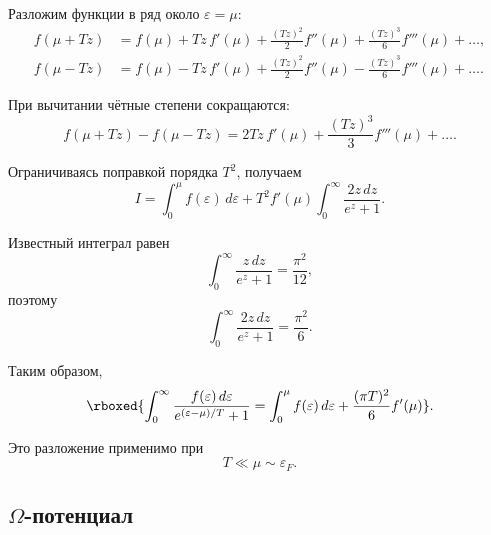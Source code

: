 \documentclass[../final.tex]{subfiles}
\begin{document}
Разложим функции в ряд около $\varepsilon=\mu$:
%
\begin{align*}
    f(\mu+Tz)
    &=
    f(\mu)
    +
    Tz\,f'(\mu)
    +
    \frac{(Tz)^2}{2}f''(\mu)
    +
    \frac{(Tz)^3}{6}f'''(\mu)
    +
    \ldots,
    \\[6pt]
    f(\mu-Tz)
    &=
    f(\mu)
    -
    Tz\,f'(\mu)
    +
    \frac{(Tz)^2}{2}f''(\mu)
    -
    \frac{(Tz)^3}{6}f'''(\mu)
    +
    \ldots.
\end{align*}

При вычитании чётные степени сокращаются:
%
\begin{equation*}
    f(\mu+Tz)-f(\mu-Tz)
    =
    2Tz\,f'(\mu)
    +
    \frac{(Tz)^3}{3}f'''(\mu)
    +
    \ldots.
\end{equation*}

Ограничиваясь поправкой порядка $T^2$, получаем
%
\begin{equation*}
    I
    =
    \int_0^\mu
    f(\varepsilon)\,d\varepsilon
    +
    T^2f'(\mu)
    \int_0^\infty
    \frac{
        2z\,dz
    }{
        e^z+1
    }.
\end{equation*}

Известный интеграл равен
%
\begin{equation*}
    \int_0^\infty
    \frac{
        z\,dz
    }{
        e^z+1
    }
    =
    \frac{\pi^2}{12},
\end{equation*}
%
поэтому
%
\begin{equation*}
    \int_0^\infty
    \frac{
        2z\,dz
    }{
        e^z+1
    }
    =
    \frac{\pi^2}{6}.
\end{equation*}

Таким образом,
%
\[
    \rboxed{
        \int_0^\infty
        \frac{
            f(\varepsilon)\,d\varepsilon
        }{
            e^{(\varepsilon-\mu)/T}+1
        }
        =
        \int_0^\mu
        f(\varepsilon)\,d\varepsilon
        +
        \frac{(\pi T)^2}{6}
        f'(\mu)
    }.
\]

Это разложение применимо при
%
\begin{equation*}
    T
    \ll
    \mu
    \sim
    \varepsilon_F.
\end{equation*}


\subsection{\texorpdfstring{$\Omega$}{Omega}-потенциал}
\end{document}
